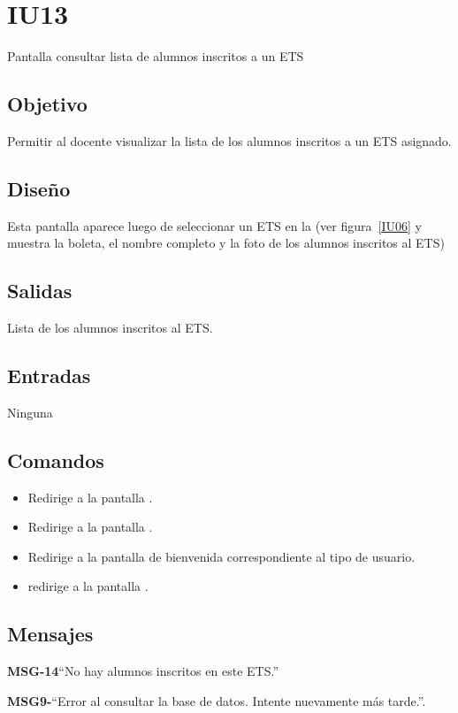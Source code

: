 \section{IU13}{Pantalla consultar lista de alumnos inscritos a un ETS}

\subsection{Objetivo}
Permitir al docente visualizar la lista de los alumnos inscritos a un ETS asignado.

\subsection{Diseño}
Esta pantalla aparece luego de seleccionar un ETS en la  (ver figura~\ref{IU06} y muestra la boleta, el nombre completo y la foto de los alumnos inscritos al ETS)


\subsection{Salidas}
Lista de los alumnos inscritos al ETS.

\subsection{Entradas}
Ninguna

\subsection{Comandos}
\begin{itemize}
    \item {} Redirige a la pantalla .
    \item {} Redirige a la pantalla .
    \item {} Redirige a la pantalla de bienvenida correspondiente al tipo de usuario.
	\item {} redirige a la pantalla .
\end{itemize}

\subsection{Mensajes}

\begin{Citemize}
	\item {\bf MSG-14}{``No hay alumnos inscritos en este ETS.''}
	\item {\bf MSG9-}{``Error al consultar la base de datos. Intente nuevamente más tarde.''}. 
\end{Citemize}